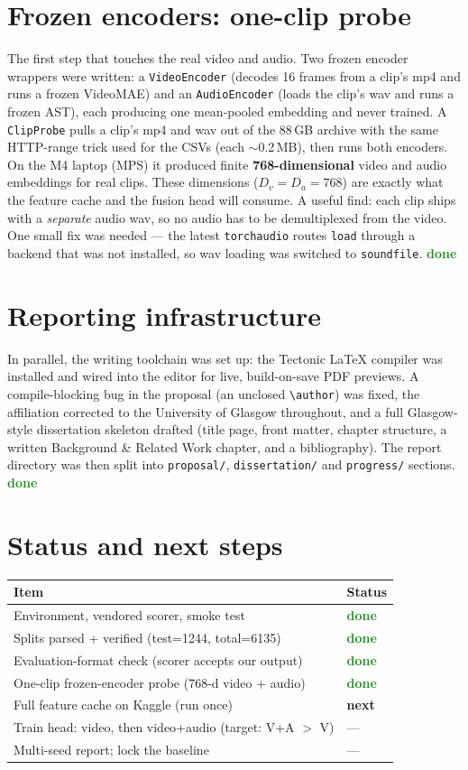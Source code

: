 \documentclass[11pt,a4paper]{article}
\newcommand{\done}{\textcolor{ForestGreen}{\textbf{done}}}
\newcommand{\next}{\textcolor{BurntOrange}{\textbf{next}}}
\begin{document}
\section{Frozen encoders: one-clip probe}
The first step that touches the real video and audio. Two frozen encoder wrappers were
written: a \texttt{VideoEncoder} (decodes 16 frames from a clip's mp4 and runs a frozen
VideoMAE) and an \texttt{AudioEncoder} (loads the clip's wav and runs a frozen AST), each
producing one mean-pooled embedding and never trained. A \texttt{ClipProbe} pulls a clip's
mp4 and wav out of the 88\,GB archive with the same HTTP-range trick used for the CSVs (each
$\sim$0.2\,MB), then runs both encoders. On the M4 laptop (MPS) it produced finite
\textbf{768-dimensional} video and audio embeddings for real clips. These dimensions
($D_v = D_a = 768$) are exactly what the feature cache and the fusion head will consume. A
useful find: each clip ships with a \emph{separate} audio wav, so no audio has to be
demultiplexed from the video. One small fix was needed --- the latest \texttt{torchaudio}
routes \texttt{load} through a backend that was not installed, so wav loading was switched to
\texttt{soundfile}. \done

\section{Reporting infrastructure}
In parallel, the writing toolchain was set up: the Tectonic LaTeX compiler was installed and
wired into the editor for live, build-on-save PDF previews. A compile-blocking bug in the
proposal (an unclosed \texttt{\textbackslash author}) was fixed, the affiliation corrected to
the University of Glasgow throughout, and a full Glasgow-style dissertation skeleton drafted
(title page, front matter, chapter structure, a written Background \& Related Work chapter, and
a bibliography). The report directory was then split into \texttt{proposal/},
\texttt{dissertation/} and \texttt{progress/} sections. \done

\section{Status and next steps}
\begin{center}
\begin{tabular}{@{}ll@{}}
\toprule
Item & Status \\
\midrule
Environment, vendored scorer, smoke test & \done \\
Splits parsed + verified (test=1244, total=6135) & \done \\
Evaluation-format check (scorer accepts our output) & \done \\
One-clip frozen-encoder probe (768-d video + audio) & \done \\
Full feature cache on Kaggle (run once) & \next \\
Train head: video, then video+audio (target: V+A $>$ V) & --- \\
Multi-seed report; lock the baseline & --- \\
\bottomrule
\end{tabular}
\end{center}
\end{document}
